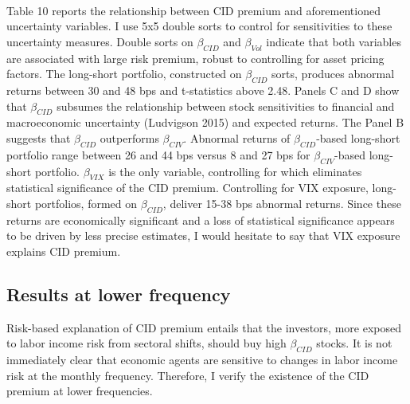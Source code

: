 \documentclass[12pt]{article}
\begin{document}
\paragraph{}
Table 10 reports the relationship between CID premium and aforementioned uncertainty variables. I use 5x5 double sorts to control for sensitivities to these uncertainty measures. Double sorts on $\beta_{CID}$ and $\beta_{Vol}$ indicate that both variables are associated with large risk premium, robust to controlling for asset pricing factors. The long-short portfolio, constructed on $\beta_{CID}$ sorts, produces abnormal returns between 30 and 48 bps and t-statistics above 2.48. Panels C and D show that $\beta_{CID}$ subsumes the relationship between stock sensitivities to financial and macroeconomic uncertainty (Ludvigson 2015) and expected returns. 
The Panel B suggests that $\beta_{CID}$ outperforms $\beta_{CIV}$. Abnormal returns of $\beta_{CID}$-based long-short portfolio range between 26 and 44 bps versus 8 and 27 bps for $\beta_{CIV}$-based long-short portfolio. $\beta_{VIX}$ is the only variable, controlling for which eliminates statistical significance of the CID premium. Controlling for VIX exposure, long-short portfolios, formed on $\beta_{CID}$, deliver 15-38 bps abnormal returns. Since these returns are economically significant and a loss of statistical significance appears to be driven by less precise estimates, I would hesitate to say that VIX exposure explains CID premium.

\subsection{Results at lower frequency}

Risk-based explanation of CID premium entails that the investors, more exposed to labor income risk from sectoral shifts, should buy high $\beta_{CID}$ stocks. It is not immediately clear that economic agents are sensitive to changes in labor income risk at the monthly frequency. Therefore, I verify the existence of the CID premium at lower frequencies.
\end{document}
